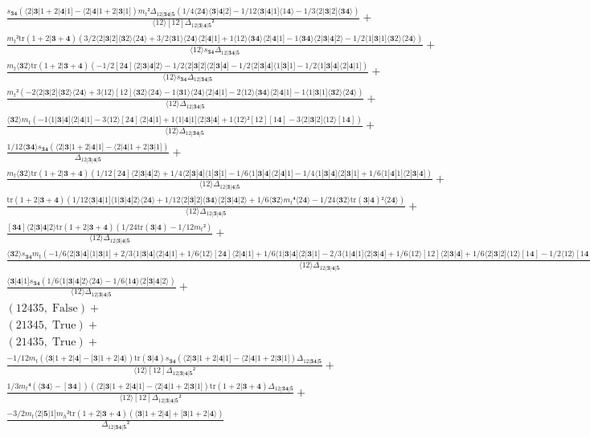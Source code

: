 \documentclass[varwidth, border=5pt]{standalone}
\newcommand{\tr}{\text{tr}}
\begin{document}
\begin{my}
$\begin{gathered}
\scriptscriptstyle\frac{s_{𝟑𝟒}(⟨2|𝟑|1+2|𝟒|1]-⟨2|𝟒|1+2|𝟑|1])m_t²Δ_{12|𝟑𝟒|𝟓}(1/4⟨2𝟒⟩⟨𝟑|𝟒|2]-1/12⟨𝟑|𝟒|1]⟨1𝟒⟩-1/3⟨2|𝟑|2]⟨𝟑𝟒⟩)}{⟨12⟩[12]Δ_{12|𝟑|𝟒|𝟓}²} +\\
\scriptscriptstyle\frac{m_t²\tr(1+2|𝟑+𝟒)(3/2⟨2|𝟑|2]⟨𝟑2⟩⟨2𝟒⟩+3/2⟨𝟑1⟩⟨2𝟒⟩⟨2|𝟒|1]+1⟨12⟩⟨𝟑𝟒⟩⟨2|𝟒|1]-1⟨𝟑𝟒⟩⟨2|𝟑|𝟒|2⟩-1/2⟨1|𝟑|1]⟨𝟑2⟩⟨2𝟒⟩)}{⟨12⟩s_{𝟑𝟒}Δ_{12|𝟑𝟒|𝟓}} +\\
\scriptscriptstyle\frac{m_t⟨𝟑2⟩\tr(1+2|𝟑+𝟒)(-1/2[2𝟒]⟨2|𝟑|𝟒|2⟩-1/2⟨2|𝟑|2]⟨2|𝟑|𝟒]-1/2⟨2|𝟑|𝟒]⟨1|𝟑|1]-1/2⟨1|𝟑|𝟒]⟨2|𝟒|1])}{⟨12⟩s_{𝟑𝟒}Δ_{12|𝟑𝟒|𝟓}} +\\
\scriptscriptstyle\frac{m_t²(-2⟨2|𝟑|2]⟨𝟑2⟩⟨2𝟒⟩+3⟨12⟩[12]⟨𝟑2⟩⟨2𝟒⟩-1⟨𝟑1⟩⟨2𝟒⟩⟨2|𝟒|1]-2⟨12⟩⟨𝟑𝟒⟩⟨2|𝟒|1]-1⟨1|𝟑|1]⟨𝟑2⟩⟨2𝟒⟩)}{⟨12⟩Δ_{12|𝟑𝟒|𝟓}} +\\
\scriptscriptstyle\frac{⟨𝟑2⟩m_t(-1⟨1|𝟑|𝟒]⟨2|𝟒|1]-3⟨12⟩[2𝟒]⟨2|𝟒|1]+1⟨1|𝟒|1]⟨2|𝟑|𝟒]+1⟨12⟩²[12][1𝟒]-3⟨2|𝟑|2]⟨12⟩[1𝟒])}{⟨12⟩Δ_{12|𝟑𝟒|𝟓}} +\\
\scriptscriptstyle\frac{1/12⟨𝟑𝟒⟩s_{𝟑𝟒}(⟨2|𝟑|1+2|𝟒|1]-⟨2|𝟒|1+2|𝟑|1])}{Δ_{12|𝟑|𝟒|𝟓}} +\\
\scriptscriptstyle\frac{m_t⟨𝟑2⟩\tr(1+2|𝟑+𝟒)(1/12[2𝟒]⟨2|𝟑|𝟒|2⟩+1/4⟨2|𝟑|𝟒]⟨1|𝟑|1]-1/6⟨1|𝟑|𝟒]⟨2|𝟒|1]-1/4⟨1|𝟑|𝟒]⟨2|𝟑|1]+1/6⟨1|𝟒|1]⟨2|𝟑|𝟒])}{⟨12⟩Δ_{12|𝟑|𝟒|𝟓}} +\\
\scriptscriptstyle\frac{\tr(1+2|𝟑+𝟒)(1/12⟨𝟑|𝟒|1]⟨1|𝟑|𝟒|2⟩⟨2𝟒⟩+1/12⟨2|𝟑|2]⟨𝟑𝟒⟩⟨2|𝟑|𝟒|2⟩+1/6⟨𝟑2⟩m_t⁴⟨2𝟒⟩-1/24⟨𝟑2⟩\tr(𝟑|𝟒)²⟨2𝟒⟩)}{⟨12⟩Δ_{12|𝟑|𝟒|𝟓}} +\\
\scriptscriptstyle\frac{[𝟑𝟒]⟨2|𝟑|𝟒|2⟩\tr(1+2|𝟑+𝟒)(1/24\tr(𝟑|𝟒)-1/12m_t²)}{⟨12⟩Δ_{12|𝟑|𝟒|𝟓}} +\\
\scriptscriptstyle\frac{⟨𝟑2⟩s_{𝟑𝟒}m_t(-1/6⟨2|𝟑|𝟒]⟨1|𝟑|1]+2/3⟨1|𝟑|𝟒]⟨2|𝟒|1]+1/6⟨12⟩[2𝟒]⟨2|𝟒|1]+1/6⟨1|𝟑|𝟒]⟨2|𝟑|1]-2/3⟨1|𝟒|1]⟨2|𝟑|𝟒]+1/6⟨12⟩[12]⟨2|𝟑|𝟒]+1/6⟨2|𝟑|2]⟨12⟩[1𝟒]-1/2⟨12⟩[1𝟒]\tr(𝟑|𝟒))}{⟨12⟩Δ_{12|𝟑|𝟒|𝟓}} +\\
\scriptscriptstyle\frac{⟨𝟑|𝟒|1]s_{𝟑𝟒}(1/6⟨1|𝟑|𝟒|2⟩⟨2𝟒⟩-1/6⟨1𝟒⟩⟨2|𝟑|𝟒|2⟩)}{⟨12⟩Δ_{12|𝟑|𝟒|𝟓}} +\\
\scriptscriptstyle(12435,\;\text{False}) +\\
\scriptscriptstyle(21345,\;\text{True}) +\\
\scriptscriptstyle(21435,\;\text{True}) +\\
\scriptscriptstyle\frac{-1/12m_t(⟨𝟑|1+2|𝟒]-[𝟑|1+2|𝟒⟩)\tr(𝟑|𝟒)s_{𝟑𝟒}(⟨2|𝟑|1+2|𝟒|1]-⟨2|𝟒|1+2|𝟑|1])Δ_{12|𝟑𝟒|𝟓}}{⟨12⟩[12]Δ_{12|𝟑|𝟒|𝟓}²} +\\
\scriptscriptstyle\frac{1/3m_t⁴(⟨𝟑𝟒⟩-[𝟑𝟒])(⟨2|𝟑|1+2|𝟒|1]-⟨2|𝟒|1+2|𝟑|1])\tr(1+2|𝟑+𝟒)Δ_{12|𝟑𝟒|𝟓}}{⟨12⟩[12]Δ_{12|𝟑|𝟒|𝟓}²} +\\
\scriptscriptstyle\frac{-3/2m_t⟨2|𝟓|1]m_h²\tr(1+2|𝟑+𝟒)(⟨𝟑|1+2|𝟒]+[𝟑|1+2|𝟒⟩)}{Δ_{12|𝟑𝟒|𝟓}²} \phantom{+}
\end{gathered}$
\end{my}
\end{document}
